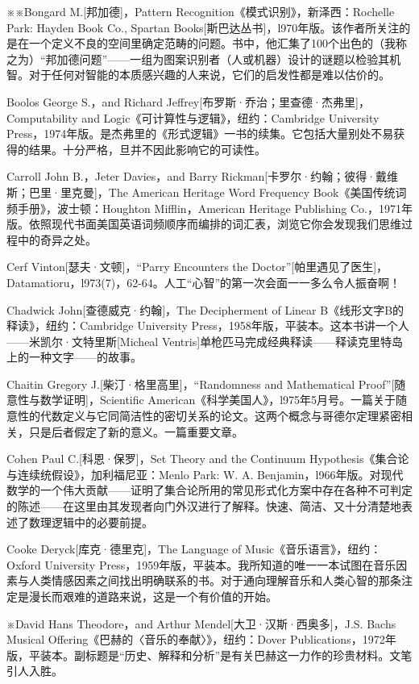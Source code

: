 \documentclass[
  12pt,
  twoside,
  openright,
  oldfontcommands,
]{memoir}
\begin{document}
※※Bongard M.{[}邦加德{]}，Pattern Recognition《模式识别》，新泽西：Rochelle Park: Hayden Book Co., Spartan Books{[}斯巴达丛书{]}，l970年版。该作者所关注的是在一个定义不良的空间里确定范畴的问题。书中，他汇集了100个出色的（我称之为）``邦加德问题''------一组为图案识别者（人或机器）设计的谜题以检验其机智。对于任何对智能的本质感兴趣的人来说，它们的启发性都是难以估价的。

Boolos George S.，and Richard Jeffrey{[}布罗斯·乔治；里查德·杰弗里{]}，Computability and Logic《可计算性与逻辑》，纽约：Cambridge University Press，1974年版。是杰弗里的《形式逻辑》一书的续集。它包括大量别处不易获得的结果。十分严格，旦并不因此影响它的可读性。

Carroll John B.，Jeter Davies，and Barry Rickman{[}卡罗尔·约翰；彼得·戴维斯；巴里·里克曼{]}，The American Heritage Word Frequency Book《美国传统词频手册》，波士顿：Houghton Mifflin，American Heritage Publishing Co.，1971年版。依照现代书面美国英语词频顺序而编排的词汇表，浏览它你会发现我们思维过程中的奇异之处。

Cerf Vinton{[}瑟夫·文顿{]}，``Parry Encounters the Doctor''{[}帕里遇见了医生{]}，Datamatioru，l973(7)，62-64。人工``心智''的第一次会面一一多么令人振奋啊！

Chadwick John{[}查德威克·约翰{]}，The Decipherment of Linear B《线形文字B的释读》，纽约：Cambridge University Press，1958年版，平装本。这本书讲一个人------米凯尔·文特里斯{[}Micheal Ventris{]}单枪匹马完成经典释读------释读克里特岛上的一种文字------的故事。

Chaitin Gregory J.{[}柴汀·格里高里{]}，``Randomness and Mathematical Proof''{[}随意性与数学证明{]}，Scientific American《科学美国人》，l975年5月号。一篇关于随意性的代数定义与它同简洁性的密切关系的论文。这两个概念与哥德尔定理紧密相关，只是后者假定了新的意义。一篇重要文章。

Cohen Paul C.{[}科恩·保罗{]}，Set Theory and the Continuum Hypothesis《集合论与连续统假设》，加利福尼亚：Menlo Park: W. A. Benjamin，l966年版。对现代数学的一个伟大贡献------证明了集合论所用的常见形式化方案中存在各种不可判定的陈述------在这里由其发现者向门外汉进行了解释。快速、简洁、又十分清楚地表述了数理逻辑中的必要前提。

Cooke Deryck{[}库克·德里克{]}，The Language of Music《音乐语言》，纽约：Oxford University Press，1959年版，平装本。我所知道的唯一一本试图在音乐因素与人类情感因素之间找出明确联系的书。对于通向理解音乐和人类心智的那条注定是漫长而艰难的道路来说，这是一个有价值的开始。

※David Hans Theodore，and Arthur Mendel{[}大卫·汉斯·西奥多{]}，J.S. Bach\textquotesingle s Musical Offering《巴赫的〈音乐的奉献〉》，纽约：Dover Publications，1972年版，平装本。副标题是``历史、解释和分析''是有关巴赫这一力作的珍贵材料。文笔引人入胜。
\end{document}
